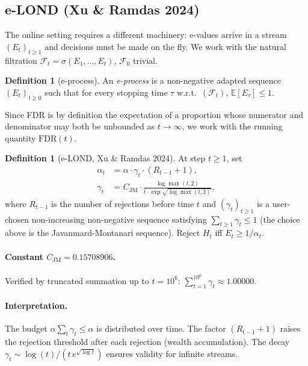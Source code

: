 \documentclass[11pt,a4paper,twocolumn]{article}
\theoremstyle{plain}
\theoremstyle{definition}
\newtheorem{definition}[theorem]{Definition}
\theoremstyle{remark}
\newcommand{\E}{\mathbb{E}}
\newcommand{\FDR}{\mathrm{FDR}}
\begin{document}
\subsection{e-LOND (Xu \& Ramdas 2024)}
\label{sec:elond}

The online setting requires a different machinery: e-values arrive in a
stream $(E_t)_{t \ge 1}$ and decisions must be made on the fly. We work with
the natural filtration $\mathcal{F}_t = \sigma(E_1, \ldots, E_t)$,
$\mathcal{F}_0$ trivial.

\begin{definition}[e-process]
An \emph{e-process} is a non-negative adapted sequence $(E_t)_{t \geq 0}$
such that for every stopping time $\tau$ w.r.t.\ $(\mathcal{F}_t)$,
$\E[E_\tau] \leq 1$.
\end{definition}

Since FDR is by definition the expectation of a proportion whose numerator
and denominator may both be unbounded as $t \to \infty$, we work with the
running quantity $\FDR(t)$.

\begin{definition}[e-LOND, Xu \& Ramdas 2024]
At step $t \geq 1$, set
\begin{align}\label{eq:elond}
  \alpha_t &= \alpha \cdot \gamma_t \cdot (R_{t-1} + 1),\nonumber\\
  \gamma_t &= C_\mathrm{JM} \cdot
    \frac{\log\max(t,2)}{t \cdot \exp\!\sqrt{\log\max(t,2)}},
\end{align}
where $R_{t-1}$ is the number of rejections before time $t$ and
$(\gamma_t)_{t \geq 1}$ is a user-chosen non-increasing non-negative sequence
satisfying $\sum_{t \geq 1} \gamma_t \leq 1$ (the choice above is the
Javanmard-Montanari sequence). Reject $H_t$ iff $E_t \geq 1/\alpha_t$.
\end{definition}

\paragraph{Constant $C_\mathrm{JM} = 0.15708906$.}
Verified by truncated summation up to $t = 10^6$:
$\sum_{t=1}^{10^6} \gamma_t \approx 1.00000$.

\paragraph{Interpretation.}
The budget $\alpha \sum_t \gamma_t \leq \alpha$ is distributed over time. The
factor $(R_{t-1}+1)$ raises the rejection threshold after each rejection
(wealth accumulation). The decay $\gamma_t \sim \log(t)/(t\,e^{\sqrt{\log t}})$
ensures validity for infinite streams.
\end{document}
